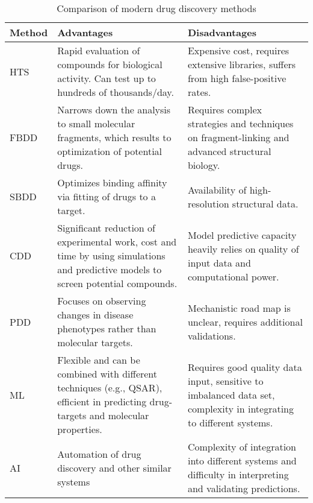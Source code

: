 \begin{table}[h] 
	\centering
	\begin{threeparttable}
		\renewcommand{\arraystretch}{1.2} 
		\small
		\begin{tabular}{p{4cm} p{6cm} p{6cm}}
			\hline
			\textbf{Method} & \textbf{Advantages} & \textbf{Disadvantages} \\
			\hline
			HTS \cite{martis2011highHTS} & Rapid evaluation of compounds for biological activity. Can test up to hundreds of thousands/day.& Expensive cost, requires extensive libraries, suffers from high false-positive rates. \\
			
			FBDD \cite{chen2025fragment} & Narrows down the analysis to small molecular fragments, which results to optimization of potential drugs. & Requires complex strategies and techniques on fragment-linking and advanced structural biology. \\
			
			SBDD \cite{batool2019structure} & Optimizes binding affinity via fitting of drugs to a target. & Availability of high-resolution structural data. \\
			
			CDD \cite{batool2019structure} & Significant reduction of experimental work, cost and time by using simulations and predictive models to screen potential compounds. & Model predictive capacity heavily relies on quality of input data and computational power. \\
			
			PDD \cite{garaci2024PDD} & Focuses on observing changes in disease phenotypes rather than molecular targets. & Mechanistic road map is unclear, requires additional validations. \\
			
			ML \cite{ammad2014integrative} & Flexible and can be combined with different techniques (e.g., QSAR), efficient in predicting drug-targets and molecular properties. & Requires good quality data input, sensitive to imbalanced data set, complexity in integrating to different systems. \\
			
			AI \cite{article} & Automation of drug discovery and other similar systems & Complexity of integration into different systems and difficulty in interpreting and validating predictions. \\
			\hline
		\end{tabular}
	\end{threeparttable}
	\caption{Comparison of modern drug discovery methods} 
	\label{tab:modern_methods} %
\end{table}


